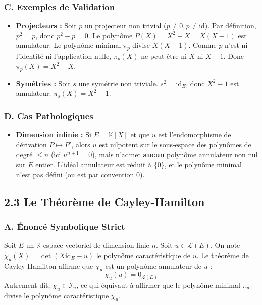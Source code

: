 \documentclass[11pt,a4paper]{article}
\begin{document}
\subsubsection{C. Exemples de Validation}
\begin{itemize}
\item \textbf{Projecteurs :} Soit $p$ un projecteur non trivial ($p \neq 0, p \neq \text{id}$). Par définition, $p^2 = p$, donc $p^2 - p = 0$. Le polynôme $P(X) = X^2 - X = X(X-1)$ est annulateur. Le polynôme minimal $\pi_p$ divise $X(X-1)$. Comme $p$ n'est ni l'identité ni l'application nulle, $\pi_p(X)$ ne peut être ni $X$ ni $X-1$. Donc $\pi_p(X) = X^2 - X$.
\item \textbf{Symétries :} Soit $s$ une symétrie non triviale. $s^2 = \text{id}_E$, donc $X^2 - 1$ est annulateur. $\pi_s(X) = X^2 - 1$.
\end{itemize}

\subsubsection{D. Cas Pathologiques}
\begin{itemize}
\item \textbf{Dimension infinie :} Si $E = \mathbb{K}[X]$ et que $u$ est l'endomorphisme de dérivation $P \mapsto P'$, alors $u$ est nilpotent sur le sous-espace des polynômes de degré $\le n$ (ici $u^{n+1} = 0$), mais n'admet \textbf{aucun} polynôme annulateur non nul sur $E$ entier. L'idéal annulateur est réduit à $\{0\}$, et le polynôme minimal n'est pas défini (ou est par convention $0$).
\end{itemize}

\subsection{2.3 Le Théorème de Cayley-Hamilton}

\subsubsection{A. Énoncé Symbolique Strict}
Soit $E$ un $\mathbb{K}$-espace vectoriel de dimension finie $n$. Soit $u \in \mathcal{L}(E)$.
On note $\chi_u(X) = \det(X \text{id}_E - u)$ le polynôme caractéristique de $u$.
Le théorème de Cayley-Hamilton affirme que $\chi_u$ est un polynôme annulateur de $u$ :
$$\chi_u(u) = 0_{\mathcal{L}(E)}$$
Autrement dit, $\chi_u \in \mathcal{I}_u$, ce qui équivaut à affirmer que le polynôme minimal $\pi_u$ divise le polynôme caractéristique $\chi_u$.
\end{document}
